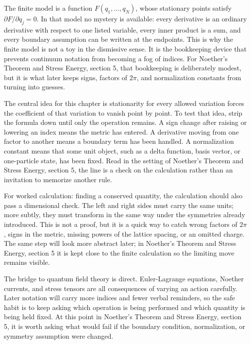 The finite model is a function \(F(q_1,\ldots,q_N)\), whose stationary points satisfy \( \partial F/\partial q_j=0 \).  In that model no mystery is available: every derivative is an ordinary derivative with respect to one listed variable, every inner product is a sum, and every boundary assumption can be written at the endpoints.  This is why the finite model is not a toy in the dismissive sense.  It is the bookkeeping device that prevents continuum notation from becoming a fog of indices.  For Noether's Theorem and Stress Energy, section 5, that bookkeeping is deliberately modest, but it is what later keeps signs, factors of \(2\pi\), and normalization constants from turning into guesses.

The central idea for this chapter is stationarity for every allowed variation forces the coefficient of that variation to vanish point by point.  To test that idea, strip the formula down until only the operation remains.  A sign change after raising or lowering an index means the metric has entered.  A derivative moving from one factor to another means a boundary term has been handled.  A normalization constant means that some unit object, such as a delta function, basis vector, or one-particle state, has been fixed.  Read in the setting of Noether's Theorem and Stress Energy, section 5, the line is a check on the calculation rather than an invitation to memorize another rule.

For worked calculation: finding a conserved quantity, the calculation should also pass a dimensional check.  The left and right sides must carry the same units; more subtly, they must transform in the same way under the symmetries already introduced.  This is not a proof, but it is a quick way to catch wrong factors of \(2\pi\), signs in the metric, missing powers of the lattice spacing, or an omitted charge.  The same step will look more abstract later; in Noether's Theorem and Stress Energy, section 5 it is kept close to the finite calculation so the limiting move remains visible.

The bridge to quantum field theory is direct.  Euler-Lagrange equations, Noether currents, and stress tensors are all consequences of varying an action carefully.  Later notation will carry more indices and fewer verbal reminders, so the safe habit is to keep asking which operation is being performed and which quantity is being held fixed.  At this point in Noether's Theorem and Stress Energy, section 5, it is worth asking what would fail if the boundary condition, normalization, or symmetry assumption were changed.

